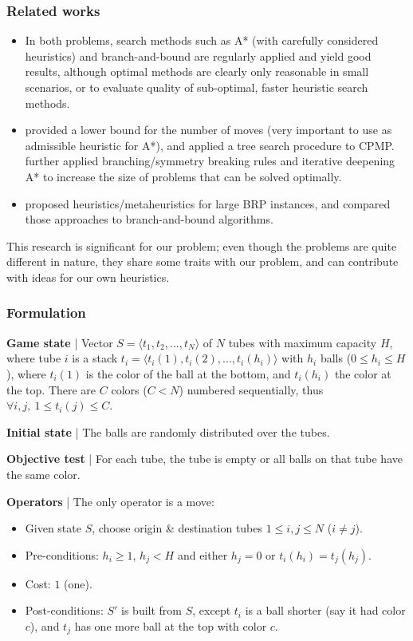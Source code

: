 \documentclass{beamer}
\begin{document}
\begin{frame}
\frametitle{Related works}
\begin{itemize}
\item In both problems, search methods such as A* (with carefully considered heuristics) and branch-and-bound are regularly applied and yield good results, although optimal methods are clearly only reasonable in small scenarios, or to evaluate quality of sub-optimal, faster heuristic search methods.

\item \cite{bortfeldt2012} provided a lower bound for the number of moves (very important to use as admissible heuristic for A*), and applied a tree search procedure to CPMP. \cite{tierney2017} further applied branching/symmetry breaking rules and iterative deepening A* to increase the size of problems that can be solved optimally.

\item \cite{tricoire2018} proposed heuristics/metaheuristics for large BRP instances, and compared those approaches to branch-and-bound algorithms.
\end{itemize}

This research is significant for our problem; even though the problems are quite different in nature, they share some traits with our problem, and can contribute with ideas for our own heuristics.

\end{frame}

\begin{frame}[fragile=singleslide]
\frametitle{Formulation}

\textbf{Game state} | Vector $S = \langle t_1, t_2, ..., t_N \rangle$ of $N$ tubes with maximum capacity $H$, where tube $i$ is a stack $t_i = \langle t_i(1), t_i(2), ..., t_i(h_i) \rangle$ with $h_i$ balls ($0 \leq h_i \leq H$), where $t_i(1)$ is the color of the ball at the bottom, and $t_i(h_i)$ the color at the top. There are $C$ colors ($C < N$) numbered sequentially, thus $\forall i, j,~1 \leq t_i(j) \leq C$.

\textbf{Initial state} | The balls are randomly distributed over the tubes.

\textbf{Objective test} | For each tube, the tube is empty or all balls on that tube have the same color.

\textbf{Operators} | The only operator is a move:
\begin{itemize}
  \item Given state $S$, choose origin \& destination tubes $1 \leq i, j \leq N$ ($i \neq j$).
  \item Pre-conditions: $h_i \geq 1$, $h_j < H$ and either $h_j = 0$ or $t_i(h_i)=t_j(h_j)$.
  \item Cost: $1$ (one).
  \item Post-conditions: $S'$ is built from $S$, except $t_i$ is a ball shorter (say it had color $c$), and $t_j$ has one more ball at the top with color $c$.
\end{itemize}

\end{frame}
\end{document}
